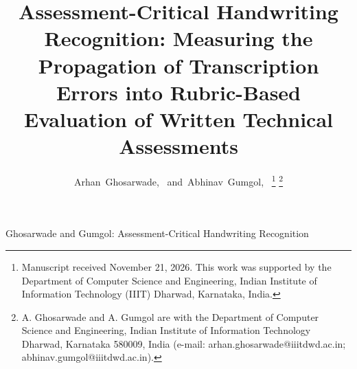 \documentclass[journal]{IEEEtran}
\begin{document}
\title{Assessment-Critical Handwriting Recognition: Measuring the Propagation of Transcription Errors into Rubric-Based Evaluation of Written Technical Assessments}

\author{Arhan~Ghosarwade,~
        and~Abhinav~Gumgol,~%
\thanks{Manuscript received November 21, 2026. This work was supported by the Department of Computer Science and Engineering, Indian Institute of Information Technology (IIIT) Dharwad, Karnataka, India.}%
\thanks{A. Ghosarwade and A. Gumgol are with the Department of Computer Science and Engineering, Indian Institute of Information Technology Dharwad, Karnataka 580009, India (e-mail: arhan.ghosarwade@iiitdwd.ac.in; abhinav.gumgol@iiitdwd.ac.in).}%
}

%
{Ghosarwade and Gumgol: Assessment-Critical Handwriting Recognition}

\maketitle
\end{document}
